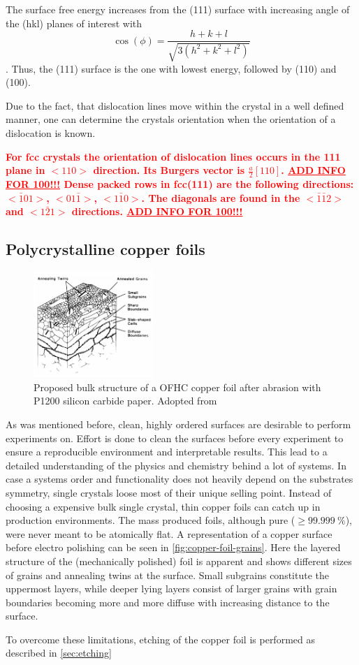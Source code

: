 The surface free energy increases from the (111) surface with increasing angle of the (hkl) planes of interest with $$\cos(\phi)=\frac{h+k+l}{\sqrt{3(h^2+k^2+l^2)}}$$ \cite{jian-min_calculation_2004}. Thus, the (111) surface is the one with lowest energy, followed by (110) and (100).

Due to the fact, that dislocation lines move within the crystal in a well defined manner, one can determine the crystals orientation when the orientation of a dislocation is known.

\textcolor{red}{\textbf{
For fcc crystals the orientation of dislocation lines occurs in the {111} plane in $<110>$ direction. Its Burgers vector is $\frac{a}{2}[110]$\cite{_dislocation-theory}. \underline{ADD INFO	FOR 100!!!}
Dense packed rows in fcc(111) are the following directions: $<\bar 1 01>$, $<01\bar 1>$, $<1\bar 1 0>$. The diagonals are found in the $<\bar 1 \bar 1 2>$ and $<1\bar 2 1>$ directions. \underline{ADD INFO	FOR 100!!!}
}}
 
 \subsection{Polycrystalline copper foils}
 
 \begin{figure}\centering
 	\includegraphics[height=40mm]{./images/grain-structure-copper-foil}
 	\caption{Proposed bulk structure of a OFHC copper foil after abrasion with P1200 silicon carbide paper. Adopted from \cite{turley_nature_1981}}
 	\label{fig:copper-foil-grains}
 \end{figure}

 As was mentioned before, clean, highly ordered surfaces are desirable to perform experiments on. Effort is done to clean the surfaces before every experiment to ensure a reproducible environment and interpretable results. This lead to a detailed understanding of the physics and chemistry behind a lot of systems. In case a systems order and functionality does not heavily depend on the substrates symmetry, single crystals loose most of their unique selling point. Instead of choosing a expensive bulk single crystal, thin copper foils can catch up in production environments. The mass produced foils, although pure ($\geq \SI{99.999}{\percent}$), were never meant to be atomically flat. 
 A representation of a copper surface before electro polishing can be seen in \autoref{fig:copper-foil-grains}. Here the layered structure of the (mechanically polished) foil is apparent and shows different sizes of grains and annealing twins at the surface. Small subgrains constitute the uppermost layers, while deeper lying layers consist of larger grains with grain boundaries becoming more and more diffuse with increasing distance to the surface.
 
To overcome these limitations, etching of the copper foil is performed as described in \autoref{sec:etching}